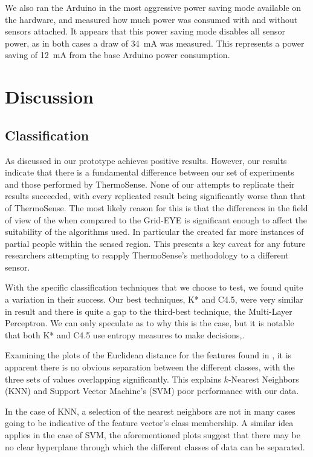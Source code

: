 \documentclass[../thesis/thesis.tex]{subfiles}
\begin{document}
We also ran the Arduino in the most aggressive power saving mode available on the hardware, and measured how much power was consumed with and without sensors attached. It appears that this power saving mode disables all sensor power, as in both cases a draw of 34~mA was measured. This represents a power saving of 12~mA from the base Arduino power consumption.

\section{Discussion}

\subsection{Classification}
As discussed in  our prototype achieves positive results. However, our results indicate that there is a fundamental difference between our set of experiments and those performed by ThermoSense. None of our attempts to replicate their results succeeded, with every replicated result being significantly worse than that of ThermoSense. The most likely reason for this is that the differences in the field of view of the \mlx when compared to the Grid-EYE is significant enough to affect the suitability of the algorithms used. In particular the \mlx created far more instances of partial people within the sensed region. This presents a key caveat for any future researchers attempting to reapply ThermoSense's methodology to a different sensor.

With the specific classification techniques that we choose to test, we found quite a variation in their success. Our best techniques, K* and C4.5, were very similar in result and there is quite a gap to the third-best technique, the Multi-Layer Perceptron. We can only speculate as to why this is the case, but it is notable that both K* and C4.5 use entropy measures to make decisions,.

Examining the plots of the Euclidean distance for the features found in , it is apparent there is no obvious separation between the different classes, with the three sets of values overlapping significantly. This explains $k$-Nearest Neighbors (KNN) and Support Vector Machine's (SVM) poor performance with our data.

In the case of KNN, a selection of the nearest neighbors are not in many cases going to be indicative of the feature vector's class membership. A similar idea applies in the case of SVM, the aforementioned plots suggest that there may be no clear hyperplane through which the different classes of data can be separated.
\end{document}
